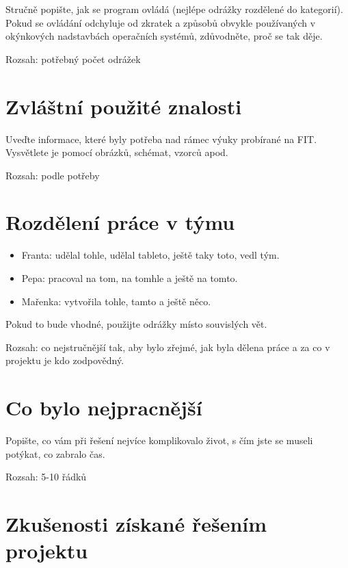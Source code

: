 \documentclass[11pt,a4paper]{article}
\begin{document}
Stručně popište, jak se program ovládá (nejlépe odrážky rozdělené do
kategorií). Pokud se ovládání odchyluje od zkratek a způsobů obvykle
používaných v okýnkových nadstavbách operačních systémů, zdůvodněte, proč se
tak děje.

Rozsah: potřebný počet odrážek

\section{Zvláštní použité znalosti}

Uveďte informace, které byly potřeba nad rámec výuky probírané na FIT.
Vysvětlete je pomocí obrázků, schémat, vzorců apod. 

Rozsah: podle potřeby 

\section{Rozdělení práce v týmu}

\begin{itemize}
\item Franta: udělal tohle, udělal tableto, ještě taky toto, vedl tým.
\item Pepa: pracoval na tom, na tomhle a ještě na tomto.
\item Mařenka: vytvořila tohle, tamto a ještě něco.
\end{itemize}
Pokud to bude vhodné, použijte odrážky místo souvislých vět.

Rozsah: co nejstručnější tak, aby bylo zřejmé, jak byla dělena práce a za co v
projektu je kdo zodpovědný.

\section{Co bylo nejpracnější}

Popište, co vám při řešení nejvíce komplikovalo život, s čím jste se museli
potýkat, co zabralo čas.

Rozsah: 5-10 řádků

\section{Zkušenosti získané řešením projektu}
\end{document}
